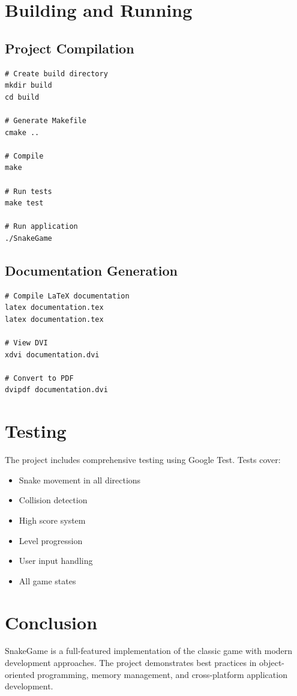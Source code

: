 \documentclass[12pt,a4paper]{article}
\begin{document}
\section{Building and Running}

\subsection{Project Compilation}
\begin{verbatim}
# Create build directory
mkdir build
cd build

# Generate Makefile
cmake ..

# Compile
make

# Run tests
make test

# Run application
./SnakeGame
\end{verbatim}

\subsection{Documentation Generation}
\begin{verbatim}
# Compile LaTeX documentation
latex documentation.tex
latex documentation.tex

# View DVI
xdvi documentation.dvi

# Convert to PDF
dvipdf documentation.dvi
\end{verbatim}

\section{Testing}

The project includes comprehensive testing using Google Test. Tests cover:

\begin{itemize}
    \item Snake movement in all directions
    \item Collision detection
    \item High score system
    \item Level progression
    \item User input handling
    \item All game states
\end{itemize}

\section{Conclusion}

SnakeGame is a full-featured implementation of the classic game with modern development approaches. The project demonstrates best practices in object-oriented programming, memory management, and cross-platform application development.
\end{document}
